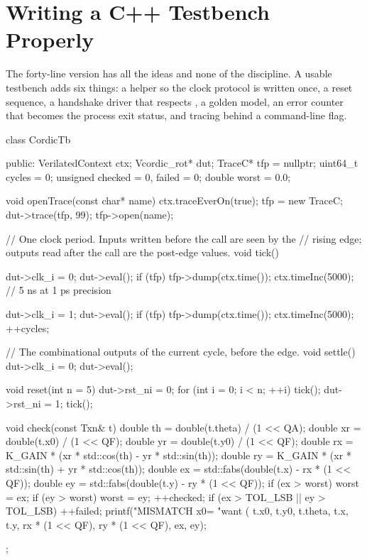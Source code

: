 \section{Writing a C++ Testbench Properly}
\label{sec:verilator:cpptb}

The forty-line version has all the ideas and none of the discipline. A usable
testbench adds six things: a  helper so the clock protocol is
written once, a reset sequence, a handshake driver that respects
, a golden model, an error counter that becomes the process exit
status, and tracing behind a command-line flag.

\begin{cppcode}[caption={The core of \file{tb\_cordic.cpp}},label={lst:verilator:tb}]
class CordicTb {
  public:
    VerilatedContext ctx;
    Vcordic_rot*     dut;
    TraceC*          tfp = nullptr;
    uint64_t         cycles = 0;
    unsigned         checked = 0, failed = 0;
    double           worst = 0.0;

    void openTrace(const char* name) {
        ctx.traceEverOn(true);
        tfp = new TraceC;
        dut->trace(tfp, 99);
        tfp->open(name);
    }

    // One clock period.  Inputs written before the call are seen by the
    // rising edge; outputs read after the call are the post-edge values.
    void tick() {
        dut->clk_i = 0; dut->eval();
        if (tfp) tfp->dump(ctx.time());
        ctx.timeInc(5000);            // 5 ns at 1 ps precision

        dut->clk_i = 1; dut->eval();
        if (tfp) tfp->dump(ctx.time());
        ctx.timeInc(5000);
        ++cycles;
    }
    // The combinational outputs of the current cycle, before the edge.
    void settle() { dut->clk_i = 0; dut->eval(); }

    void reset(int n = 5) {
        dut->rst_ni = 0;
        for (int i = 0; i < n; ++i) tick();
        dut->rst_ni = 1;
        tick();
    }

    void check(const Txn& t) {
        double th = double(t.theta) / (1 << QA);
        double xr = double(t.x0)    / (1 << QF);
        double yr = double(t.y0)    / (1 << QF);
        double rx = K_GAIN * (xr * std::cos(th) - yr * std::sin(th));
        double ry = K_GAIN * (xr * std::sin(th) + yr * std::cos(th));
        double ex = std::fabs(double(t.x) - rx * (1 << QF));
        double ey = std::fabs(double(t.y) - ry * (1 << QF));
        if (ex > worst) worst = ex;
        if (ey > worst) worst = ey;
        ++checked;
        if (ex > TOL_LSB || ey > TOL_LSB) {
            ++failed;
            printf("MISMATCH x0=%
                   "want (%
                   t.x0, t.y0, t.theta, t.x, t.y,
                   rx * (1 << QF), ry * (1 << QF), ex, ey);
        }
    }
};
\end{cppcode}

